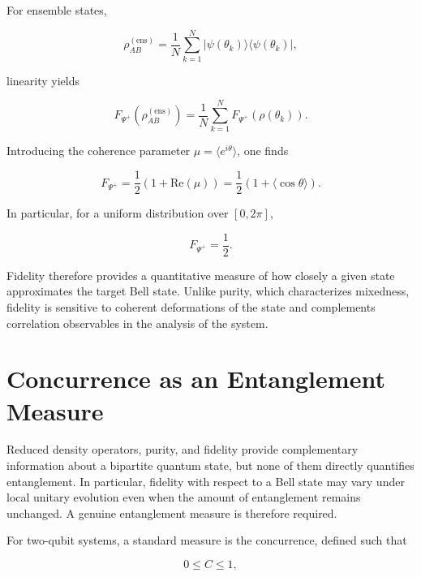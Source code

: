 \medskip

For ensemble states,

\[
\rho_{AB}^{(\mathrm{ens})}
=
\frac{1}{N}
\sum_{k=1}^{N}
|\psi(\theta_k)\rangle\langle\psi(\theta_k)|,
\]

linearity yields

\[
F_{\Psi^+}
\left(
\rho_{AB}^{(\mathrm{ens})}
\right)
=
\frac{1}{N}
\sum_{k=1}^{N}
F_{\Psi^+}
\left(
\rho(\theta_k)
\right).
\]

Introducing the coherence parameter \( \mu = \langle e^{i\theta}\rangle \), one finds

\begin{equation}
F_{\Psi^+}
=
\frac{1}{2}
\left(
1+\mathrm{Re}(\mu)
\right)
=
\frac{1}{2}
\left(
1+\langle \cos\theta\rangle
\right).
\label{eq:ensemble_fidelity_psi_plus}
\end{equation}

\medskip

In particular, for a uniform distribution over \( [0,2\pi] \),

\[
F_{\Psi^+}
=
\frac{1}{2}.
\]

\medskip

Fidelity therefore provides a quantitative measure of how closely a given state approximates the target Bell state. Unlike purity, which characterizes mixedness, fidelity is sensitive to coherent deformations of the state and complements correlation observables in the analysis of the system.


\section{Concurrence as an Entanglement Measure}

Reduced density operators, purity, and fidelity provide complementary information about a bipartite quantum state, but none of them directly quantifies entanglement. In particular, fidelity with respect to a Bell state may vary under local unitary evolution even when the amount of entanglement remains unchanged. A genuine entanglement measure is therefore required.

\medskip

For two-qubit systems, a standard measure is the concurrence, defined such that

\[
0 \le C \le 1,
\]

